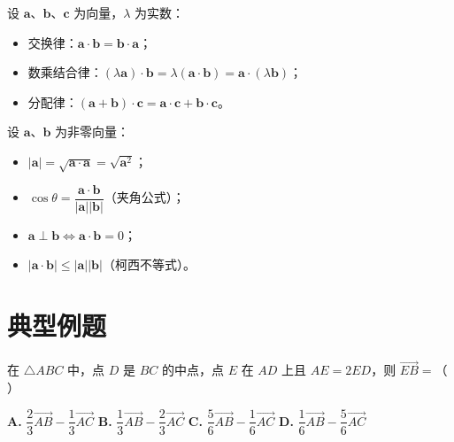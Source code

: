 \documentclass[11pt]{ctexrep}
\begin{document}
\begin{property}[数量积的运算律]
    设 $\boldsymbol{a}$、$\boldsymbol{b}$、$\boldsymbol{c}$ 为向量，$\lambda$ 为实数：
    \begin{itemize}
        \item 交换律：$\boldsymbol{a} \cdot \boldsymbol{b} = \boldsymbol{b} \cdot \boldsymbol{a}$；
        \item 数乘结合律：$(\lambda\boldsymbol{a}) \cdot \boldsymbol{b} = \lambda(\boldsymbol{a} \cdot \boldsymbol{b}) = \boldsymbol{a} \cdot (\lambda\boldsymbol{b})$；
        \item 分配律：$(\boldsymbol{a} + \boldsymbol{b}) \cdot \boldsymbol{c} = \boldsymbol{a} \cdot \boldsymbol{c} + \boldsymbol{b} \cdot \boldsymbol{c}$。
    \end{itemize}
\end{property}

\begin{property}[数量积的重要结论]
    设 $\boldsymbol{a}$、$\boldsymbol{b}$ 为非零向量：
    \begin{itemize}
        \item $|\boldsymbol{a}| = \sqrt{\boldsymbol{a} \cdot \boldsymbol{a}} = \sqrt{\boldsymbol{a}^2}$；
        \item $\cos\theta = \dfrac{\boldsymbol{a} \cdot \boldsymbol{b}}{|\boldsymbol{a}||\boldsymbol{b}|}$（夹角公式）；
        \item $\boldsymbol{a} \perp \boldsymbol{b} \Leftrightarrow \boldsymbol{a} \cdot \boldsymbol{b} = 0$；
        \item $|\boldsymbol{a} \cdot \boldsymbol{b}| \leq |\boldsymbol{a}||\boldsymbol{b}|$（柯西不等式）。
    \end{itemize}
\end{property}

\section*{典型例题}

\begin{example}[向量的线性运算]
    在 $\triangle ABC$ 中，点 $D$ 是 $BC$ 的中点，点 $E$ 在 $AD$ 上且 $AE = 2ED$，则 $\overrightarrow{EB} =$（ ）
    
    \textbf{A.} $\dfrac{2}{3}\overrightarrow{AB} - \dfrac{1}{3}\overrightarrow{AC}$ \qquad
    \textbf{B.} $\dfrac{1}{3}\overrightarrow{AB} - \dfrac{2}{3}\overrightarrow{AC}$ \qquad
    \textbf{C.} $\dfrac{5}{6}\overrightarrow{AB} - \dfrac{1}{6}\overrightarrow{AC}$ \qquad
    \textbf{D.} $\dfrac{1}{6}\overrightarrow{AB} - \dfrac{5}{6}\overrightarrow{AC}$
\end{example}
\end{document}
